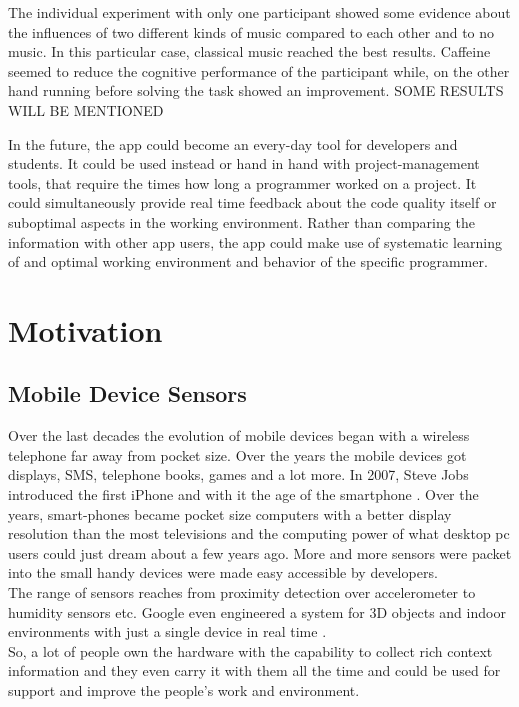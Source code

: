 The individual experiment with only one participant showed some evidence about the influences of two different kinds of music compared to each other and to no music. In this particular case, classical music reached the best results. Caffeine seemed to reduce the cognitive performance of the participant while, on the other hand running before solving the task showed an improvement. 
SOME RESULTS WILL BE MENTIONED

\bigbreak
In the future, the app could become an every-day tool for developers and students. It could be used instead or hand in hand with project-management tools, that require the times how long a programmer worked on a project. It could simultaneously provide real time feedback about the code quality itself or suboptimal aspects in the working environment. Rather than comparing the information with other app users, the app could make use of systematic learning of and optimal working environment and behavior of the specific programmer.

\section{Motivation}
\subsection{Mobile Device Sensors}
Over the last decades the evolution of mobile devices began with a wireless telephone far away from pocket size. Over the years the mobile devices got displays, SMS, telephone books, games and a lot more. In 2007, Steve Jobs introduced the first iPhone and with it the age of the smartphone  \cite{laugesen2010factors}. Over the years, smart-phones became pocket size computers with a better display resolution than the most televisions and the computing power of what desktop pc users could just dream about a few years ago. More and more sensors were packet into the small handy devices were made easy accessible by developers.\\
The range of sensors reaches from proximity detection over accelerometer to humidity sensors etc. Google even engineered a system for 3D objects and indoor environments with just a single device in real time \cite{schops20153d}.\\
So, a lot of people own the hardware with the capability to collect rich context information and they even carry it with them all the time and could be used for support and improve the people's work and environment.

